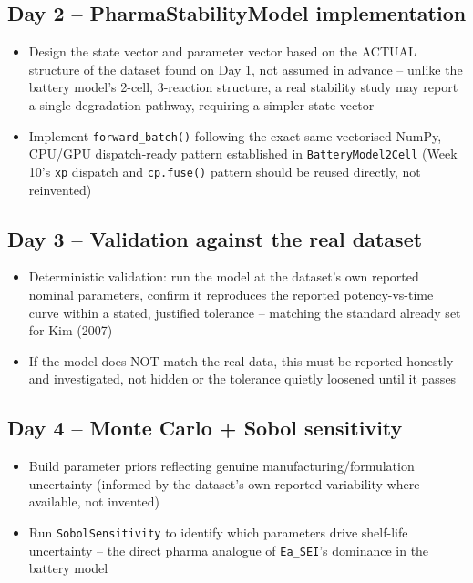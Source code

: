 \documentclass[11pt]{article}
\begin{document}
\subsection*{Day 2 -- PharmaStabilityModel implementation}
\begin{itemize}[leftmargin=*]
  \item Design the state vector and parameter vector based on the
    ACTUAL structure of the dataset found on Day 1, not assumed in
    advance -- unlike the battery model's 2-cell, 3-reaction
    structure, a real stability study may report a single degradation
    pathway, requiring a simpler state vector
  \item Implement \texttt{forward\_batch()} following the exact same
    vectorised-NumPy, CPU/GPU dispatch-ready pattern established in
    \texttt{BatteryModel2Cell} (Week 10's \texttt{xp} dispatch and
    \texttt{cp.fuse()} pattern should be reused directly, not
    reinvented)
\end{itemize}

\subsection*{Day 3 -- Validation against the real dataset}
\begin{itemize}[leftmargin=*]
  \item Deterministic validation: run the model at the dataset's own
    reported nominal parameters, confirm it reproduces the reported
    potency-vs-time curve within a stated, justified tolerance --
    matching the standard already set for Kim (2007)
  \item If the model does NOT match the real data, this must be
    reported honestly and investigated, not hidden or the tolerance
    quietly loosened until it passes
\end{itemize}

\subsection*{Day 4 -- Monte Carlo + Sobol sensitivity}
\begin{itemize}[leftmargin=*]
  \item Build parameter priors reflecting genuine
    manufacturing/formulation uncertainty (informed by the dataset's
    own reported variability where available, not invented)
  \item Run \texttt{SobolSensitivity} to identify which parameters
    drive shelf-life uncertainty -- the direct pharma analogue of
    \texttt{Ea\_SEI}'s dominance in the battery model
\end{itemize}
\end{document}
